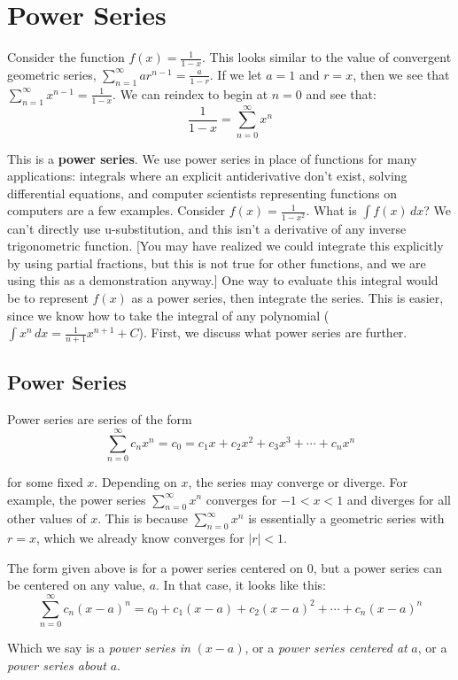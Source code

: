\chapter{Power Series}

Consider the function $f(x) = \frac{1}{1-x}$. This looks similar to the value 
of convergent geometric series, $\sum_{n=1}^\infty ar^{n-1} = \frac{a}{1-r}$. 
If we let $a = 1$ and $r = x$, then we see that $\sum_{n=1}^\infty x^{n-1} = 
\frac{1}{1-x}$. We can reindex to begin at $n=0$ and see that:
$$\frac{1}{1-x} = \sum_{n=0}^\infty x^n$$

This is a \textbf{power series}. We use power series in place of functions for many 
applications: integrals where an explicit antiderivative don't exist, solving 
differential equations, and computer scientists representing functions on 
computers are a few examples. Consider $f(x) = \frac{1}{1-x^2}$. What is $\int 
f(x)\,dx$? We can't directly use u-substitution, and this isn't a derivative of 
any inverse trigonometric function. [You may have realized we could integrate 
this explicitly by using partial fractions, but this is not true for other 
functions, and we are using this as a demonstration anyway.] One way to 
evaluate this integral would be to represent $f(x)$ as a power series, then 
integrate the series. This is easier, since we know how to take the integral 
of any polynomial ($\int x^n\,dx = \frac{1}{n+1}x^{n+1} + C$). First, we 
discuss what power series are further.

\section{Power Series}
Power series are series of the form 
$$\sum_{n=0}^\infty c_n x^n = c_0 = c_1 x + c_2 x^2 + c_3 x^3 + \cdots + c_n 
x^n$$

for some fixed $x$. Depending on $x$, the series may converge or diverge. For 
example, the power series $\sum_{n=0}^\infty x^n$ converges for $ -1 < x < 1$ 
and diverges for all other values of $x$. This is because $\sum_{n=0}^\infty 
x^n$ is essentially a geometric series with $r = x$, which we already know 
converges for $|r|<1$. 

The form given above is for a power series centered on $0$, but a power series 
can be centered on any value, $a$. In that case, it looks like this:
$$\sum_{n=0}^\infty c_n (x - a)^n = c_0 + c_1(x - a) + c_2(x - a)^2 + \cdots + 
c_n(x - a)^n$$

Which we say is a \textit{power series in }$(x - a)$, or a \textit{power 
series centered at }$a$, or a \textit{power series about }$a$. 

